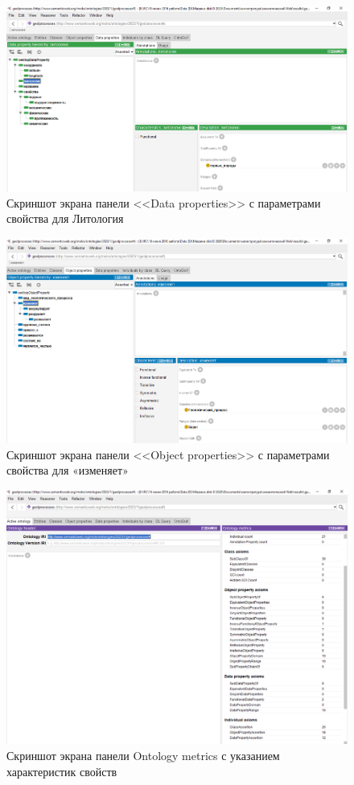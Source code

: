 \documentclass[732,14pt,final]{studrep}
\begin{document}
  \begin{figure}[htp]
	\centering
	\includegraphics[width=0.9\linewidth]{pics/image24.png}
    \caption{Скриншот экрана панели <<Data properties>> с параметрами свойства для Литология}
    \label{fig:data-props}
  \end{figure}

  \begin{figure}[htp]
	\centering
	\includegraphics[width=0.9\linewidth]{pics/image10.png}
    \caption{Скриншот экрана панели <<Object properties>> с параметрами свойства для «изменяет»}
    \label{fig:obj-props}
  \end{figure}

  \begin{figure}[htp]
	\centering
	\includegraphics[width=0.9\linewidth]{pics/image19.png}
    \caption{Скриншот экрана панели Ontology metrics с указанием характеристик свойств}
    \label{fig:onto-metrics}
  \end{figure}
\end{document}
